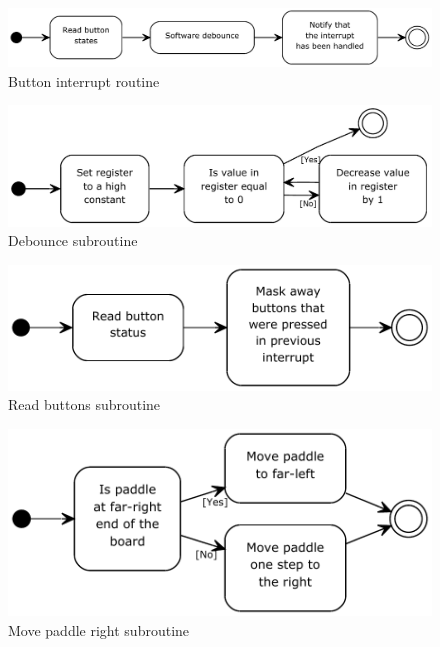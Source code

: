 \begin{figure}
\includegraphics[width = \textwidth]{description-and-methodology/program-flow/button-interrupt-routine.pdf}
\caption{Button interrupt routine}
\label{fig:hist}
\end{figure}

\begin{figure}
\includegraphics[width = \textwidth]{description-and-methodology/program-flow/debounce.pdf}
\caption{Debounce subroutine}
\label{fig:hist}
\end{figure}

\begin{figure}
\includegraphics[width = \textwidth]{description-and-methodology/program-flow/read-buttons.pdf}
\caption{Read buttons subroutine}
\label{fig:hist}
\end{figure}

\begin{figure}
\includegraphics[width = \textwidth]{description-and-methodology/program-flow/move-paddle-right.pdf}
\caption{Move paddle right subroutine}
\label{fig:hist}
\end{figure}

